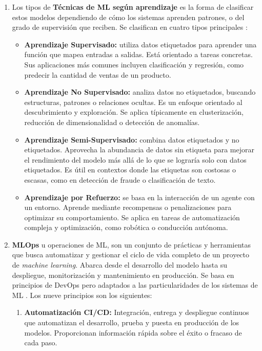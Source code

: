 \begin{enumerate}
	\vspace{1cm}

	\item Los tipos de \textbf{Técnicas de ML según aprendizaje} \label{def13} es la forma de clasificar estos modelos dependiendo de cómo los sistemas aprenden patrones, o del grado de supervisión que reciben. Se clasifican en cuatro tipos principales \citep{Sarker2021}:
	\begin{itemize}
		\item \textbf{Aprendizaje Supervisado:} utiliza datos etiquetados para aprender una función que mapea entradas a salidas. Está orientado a tareas concretas. Sus aplicaciones más comunes incluyen clasificación y regresión, como predecir la cantidad de ventas de un producto.

		\item \textbf{Aprendizaje No Supervisado:} analiza datos no etiquetados, buscando estructuras, patrones o relaciones ocultas. Es un enfoque orientado al descubrimiento y exploración. Se aplica típicamente en clusterización, reducción de dimensionalidad o detección de anomalías.

		\item \textbf{Aprendizaje Semi-Supervisado:} combina datos etiquetados y no etiquetados. Aprovecha la abundancia de datos sin etiqueta para mejorar el rendimiento del modelo más allá de lo que se lograría solo con datos etiquetados. Es útil en contextos donde las etiquetas son costosas o escasas, como en detección de fraude o clasificación de texto.

		\item \textbf{Aprendizaje por Refuerzo:} se basa en la interacción de un agente con un entorno. Aprende mediante recompensas o penalizaciones para optimizar su comportamiento. Se aplica en tareas de automatización compleja y optimización, como robótica o conducción autónoma.
	\end{itemize}

	\item \textbf{MLOps} \label{def14} u operaciones de ML, son un conjunto de prácticas y herramientas que busca automatizar y gestionar el ciclo de vida completo de un proyecto de \textit{machine learning}. Abarca desde el desarrollo del modelo hasta su despliegue, monitorización y mantenimiento en producción. Se basa en principios de DevOps pero adaptados a las particularidades de los sistemas de ML \citep{Kreuzberger2023MLOps}. Los nueve principios son los siguientes:
	\begin{enumerate}
		\item \textbf{Automatización CI/CD:} Integración, entrega y despliegue continuos que automatizan el desarrollo, prueba y puesta en producción de los modelos. Proporcionan información rápida sobre el éxito o fracaso de cada paso.


\end{enumerate}
\end{enumerate}
